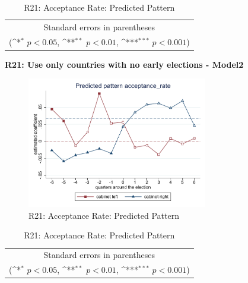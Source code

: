 \documentclass[10pt,a4paper]{scrartcl}
\begin{document}
\begin{table}[!ht]\centering
	\renewcommand{\arraystretch}{1.25}
	\def\sym#1{\ifmmode^{#1}\else\(^{#1}\)\fi}
	\caption{R21: Acceptance Rate: Predicted Pattern}
	\begin{tabular}{l*{2}{c}}
		\hline\hline
		
		\hline\hline
		\multicolumn{3}{c}{\footnotesize Standard errors in parentheses} \\
		\multicolumn{3}{c}{\footnotesize (\sym{*} \(p<0.05\), \sym{**} \(p<0.01\), \sym{***} \(p<0.001\))}\\
	\end{tabular}
\end{table}

\clearpage
\textbf{R21: Use only countries with no early elections - Model2}
\begin{figure}[!ht]
	\centering
	\includegraphics[width=0.7\textwidth]{figures_edited/acceptance_rate_graph2_R21.pdf}
	\caption{R21: Acceptance Rate: Predicted Pattern}
\end{figure}

\begin{table}[!ht]\centering
	\footnotesize
	\renewcommand{\arraystretch}{1.15}
	\def\sym#1{\ifmmode^{#1}\else\(^{#1}\)\fi}
	\caption{R21: Acceptance Rate: Predicted Pattern}
	\begin{tabular}{l*{2}{c}}
		\hline\hline
		
		\hline\hline
		\multicolumn{3}{c}{\footnotesize Standard errors in parentheses} \\
		\multicolumn{3}{c}{\footnotesize (\sym{*} \(p<0.05\), \sym{**} \(p<0.01\), \sym{***} \(p<0.001\))} \\
	\end{tabular}
\end{table}
\end{document}

